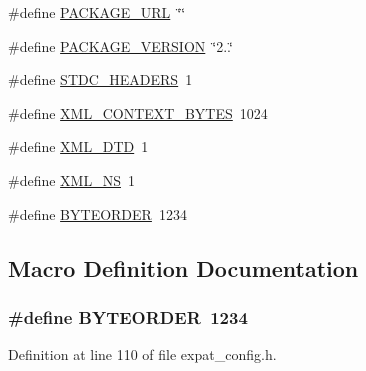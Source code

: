 \begin{DoxyCompactItemize}
\item 
\#define \hyperlink{mac_2config_2i386_2lib-src_2expat_2expat__config_8h_a5c93853116d5a50307b6744f147840aa}{P\+A\+C\+K\+A\+G\+E\+\_\+\+U\+RL}~\char`\"{}\char`\"{}
\item 
\#define \hyperlink{mac_2config_2i386_2lib-src_2expat_2expat__config_8h_aa326a05d5e30f9e9a4bb0b4469d5d0c0}{P\+A\+C\+K\+A\+G\+E\+\_\+\+V\+E\+R\+S\+I\+ON}~\char`\"{}2..\char`\"{}
\item 
\#define \hyperlink{mac_2config_2i386_2lib-src_2expat_2expat__config_8h_a550e5c272cc3cf3814651721167dcd23}{S\+T\+D\+C\+\_\+\+H\+E\+A\+D\+E\+RS}~1
\item 
\#define \hyperlink{mac_2config_2i386_2lib-src_2expat_2expat__config_8h_a2116a8741d7cbc537ea200671a959b76}{X\+M\+L\+\_\+\+C\+O\+N\+T\+E\+X\+T\+\_\+\+B\+Y\+T\+ES}~1024
\item 
\#define \hyperlink{mac_2config_2i386_2lib-src_2expat_2expat__config_8h_ac409db9803f37ad283a5096960d3d59e}{X\+M\+L\+\_\+\+D\+TD}~1
\item 
\#define \hyperlink{mac_2config_2i386_2lib-src_2expat_2expat__config_8h_a347a28734ff1f6fedce04d73db636fea}{X\+M\+L\+\_\+\+NS}~1
\item 
\#define \hyperlink{mac_2config_2i386_2lib-src_2expat_2expat__config_8h_a0c2fdec33260a22c7f28e1cc4d1de480}{B\+Y\+T\+E\+O\+R\+D\+ER}~1234
\end{DoxyCompactItemize}


\subsection{Macro Definition Documentation}
\subsubsection[{\texorpdfstring{B\+Y\+T\+E\+O\+R\+D\+ER}{BYTEORDER}}]{\setlength{\rightskip}{0pt plus 5cm}\#define B\+Y\+T\+E\+O\+R\+D\+ER~1234}\hypertarget{mac_2config_2i386_2lib-src_2expat_2expat__config_8h_a0c2fdec33260a22c7f28e1cc4d1de480}{}\label{mac_2config_2i386_2lib-src_2expat_2expat__config_8h_a0c2fdec33260a22c7f28e1cc4d1de480}


Definition at line 110 of file expat\+\_\+config.\+h.


